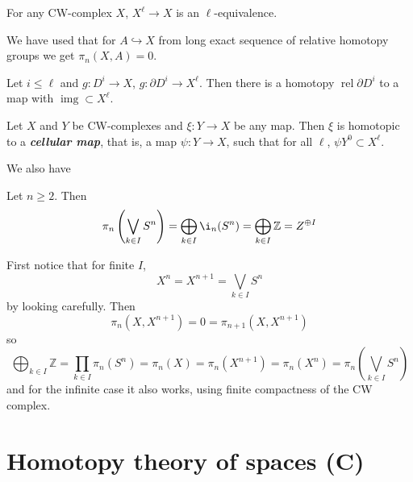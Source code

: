 \begin{prop}
	For any CW-complex $X$, $X^\ell\to X$ is an $\ell$-equivalence.
\end{prop}

\begin{remark}
	We have used that for $A\hookrightarrow X$ from long exact sequence of relative homotopy groups we get $\pi_n(X,A)=0$.
\end{remark}

\begin{coro}
	Let $i\leq \ell$ and $g: D^i\to X$, $g:\partial D^i\to X^\ell$. Then there is a homotopy $\operatorname{rel}\partial D^i$ to a map with $\operatorname{img}\subset X^\ell$.
\end{coro}

\begin{thm}
	Let $X$ and $Y$ be CW-complexes and $\xi:Y\to X$ be any map. Then $\xi$ is homotopic to a \textbf{\textit{cellular map}}, that is, a map $\psi:Y\to X$, such that for all $\ell$, $\psi Y^0\subset X^\ell$.
\end{thm}

We also have
\begin{prop}
	Let $n\geq 2$. Then 
	\[\pi_n\left(\bigvee_{k\in I}S^n\right)=\bigoplus_{k\in I}\i_n(S^n)=\bigoplus_{k\in I}\mathbb{Z}=Z^{\oplus I}\]
\end{prop}
\begin{prop}
	First notice that for finite $I$,
	\[X^n=X^{n+1}=\bigvee_{k\in I}S^n\]
	by looking carefully. Then
	\[\pi_n(X,X^{n+1})=0=\pi_{n+1}(X,X^{n+1})\]
	so
	\[\bigoplus_{k\in I}\mathbb{Z}=\prod_{k\in I}\pi_n(S^n)=\pi_n(X)=\pi_n(X^{n+1})=\pi_n(X^n)=\pi_n\left(\bigvee_{k\in I}S^n\right)\]
	and for the infinite case it also works, using finite compactness of the CW complex.
\end{prop}

\section*{Homotopy theory of spaces (C)}

